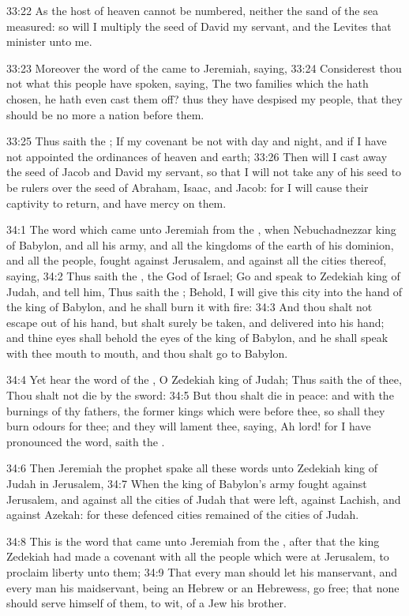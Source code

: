 33:22 As the host of heaven cannot be numbered, neither the sand of the sea measured: so will I multiply the seed of David my servant, and the Levites that minister unto me.

33:23 Moreover the word of the \LORD came to Jeremiah, saying, 33:24 Considerest thou not what this people have spoken, saying, The two families which the \LORD hath chosen, he hath even cast them off? thus they have despised my people, that they should be no more a nation before them.

33:25 Thus saith the \LORD; If my covenant be not with day and night, and if I have not appointed the ordinances of heaven and earth; 33:26 Then will I cast away the seed of Jacob and David my servant, so that I will not take any of his seed to be rulers over the seed of Abraham, Isaac, and Jacob: for I will cause their captivity to return, and have mercy on them.

34:1 The word which came unto Jeremiah from the \LORD, when Nebuchadnezzar king of Babylon, and all his army, and all the kingdoms of the earth of his dominion, and all the people, fought against Jerusalem, and against all the cities thereof, saying, 34:2 Thus saith the \LORD, the God of Israel; Go and speak to Zedekiah king of Judah, and tell him, Thus saith the \LORD; Behold, I will give this city into the hand of the king of Babylon, and he shall burn it with fire: 34:3 And thou shalt not escape out of his hand, but shalt surely be taken, and delivered into his hand; and thine eyes shall behold the eyes of the king of Babylon, and he shall speak with thee mouth to mouth, and thou shalt go to Babylon.

34:4 Yet hear the word of the \LORD, O Zedekiah king of Judah; Thus saith the \LORD of thee, Thou shalt not die by the sword: 34:5 But thou shalt die in peace: and with the burnings of thy fathers, the former kings which were before thee, so shall they burn odours for thee; and they will lament thee, saying, Ah lord! for I have pronounced the word, saith the \LORD.

34:6 Then Jeremiah the prophet spake all these words unto Zedekiah king of Judah in Jerusalem, 34:7 When the king of Babylon's army fought against Jerusalem, and against all the cities of Judah that were left, against Lachish, and against Azekah: for these defenced cities remained of the cities of Judah.

34:8 This is the word that came unto Jeremiah from the \LORD, after that the king Zedekiah had made a covenant with all the people which were at Jerusalem, to proclaim liberty unto them; 34:9 That every man should let his manservant, and every man his maidservant, being an Hebrew or an Hebrewess, go free; that none should serve himself of them, to wit, of a Jew his brother.

